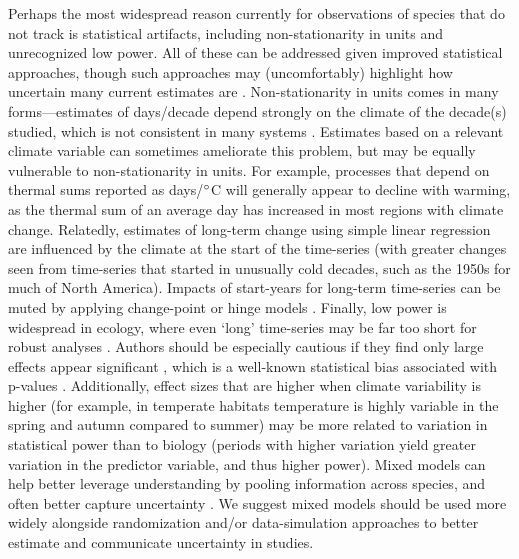 \documentclass[11pt,letterpaper]{article}
\begin{document}
Perhaps the most widespread reason currently for observations of species that do not track is statistical artifacts, including non-stationarity in units and unrecognized low power. All of these can be addressed given improved statistical approaches, though such approaches may (uncomfortably) highlight how uncertain many current estimates are \citep{brown2016}. Non-stationarity in units comes in many forms---estimates of days/decade depend strongly on the climate of the decade(s) studied, which is not consistent in many systems \citep{Ault2011,McCabe2012}. Estimates based on a relevant climate variable can sometimes ameliorate this problem, but may be equally vulnerable to non-stationarity in units. For example, processes that depend on thermal sums reported as days/$\degree$C will generally appear to decline with warming, as the thermal sum of an average day has increased in most regions with climate change. Relatedly, estimates of long-term change using simple linear regression are influenced by the climate at the start of the time-series (with greater changes seen from time-series that started in unusually cold decades, such as the 1950s for much of North America). Impacts of start-years for long-term time-series can be muted by applying change-point or hinge models \citep[e.g.,][]{kharouba2018}. Finally, low power is widespread in ecology, where even `long' time-series may be far too short for robust analyses \citep{bolmgren2013,kharouba2018}. Authors should be especially cautious if they find only large effects appear significant \citep[e.g.,][]{CaraDonna2014}, which is a well-known statistical bias associated with p-values \citep{loken2017}. Additionally, effect sizes that are higher when climate variability is higher (for example, in temperate habitats temperature is highly variable in the spring and autumn compared to summer) may be more related to variation in statistical power than to biology (periods with higher variation yield greater variation in the predictor variable, and thus higher power). Mixed models can help better leverage understanding by pooling information across species, and often better capture uncertainty \citep{pearse2017}. We suggest mixed models should be used more widely alongside randomization and/or data-simulation approaches \citep[e.g.,][]{bolmgren2013,kharouba2018} to better estimate and communicate uncertainty in studies. 





\end{document}
